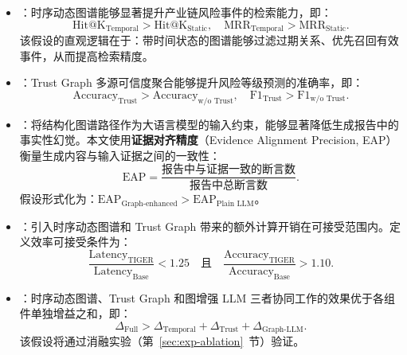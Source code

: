 \begin{itemize}
    \item {}：时序动态图谱能够显著提升产业链风险事件的检索能力，即：
    \begin{equation}
    \text{Hit@K}_{\text{Temporal}} > \text{Hit@K}_{\text{Static}}, \quad \text{MRR}_{\text{Temporal}} > \text{MRR}_{\text{Static}}.
    \end{equation}
    该假设的直观逻辑在于：带时间状态的图谱能够过滤过期关系、优先召回有效事件，从而提高检索精度。

    \item {}：Trust Graph 多源可信度聚合能够提升风险等级预测的准确率，即：
    \begin{equation}
    \text{Accuracy}_{\text{Trust}} > \text{Accuracy}_{\text{w/o Trust}}, \quad \text{F1}_{\text{Trust}} > \text{F1}_{\text{w/o Trust}}.
    \end{equation}

    \item {}：将结构化图谱路径作为大语言模型的输入约束，能够显著降低生成报告中的事实性幻觉。本文使用\textbf{证据对齐精度}（Evidence Alignment Precision, EAP）衡量生成内容与输入证据之间的一致性：
    \begin{equation}
    \text{EAP} = \frac{\text{报告中与证据一致的断言数}}{\text{报告中总断言数}}.
    \end{equation}
    假设形式化为：$\text{EAP}_{\text{Graph-enhanced}} > \text{EAP}_{\text{Plain LLM}}$。

    \item {}：引入时序动态图谱和 Trust Graph 带来的额外计算开销在可接受范围内。定义效率可接受条件为：
    \begin{equation}
    \frac{\text{Latency}_{\text{TIGER}}}{\text{Latency}_{\text{Base}}} < 1.25 \quad \text{且} \quad \frac{\text{Accuracy}_{\text{TIGER}}}{\text{Accuracy}_{\text{Base}}} > 1.10.
    \end{equation}

    \item {}：时序动态图谱、Trust Graph 和图增强 LLM 三者协同工作的效果优于各组件单独增益之和，即：
    \begin{equation}
    \Delta_{\text{Full}} > \Delta_{\text{Temporal}} + \Delta_{\text{Trust}} + \Delta_{\text{Graph-LLM}}.
    \end{equation}
    该假设将通过消融实验（第~\ref{sec:exp-ablation}~节）验证。
\end{itemize}

